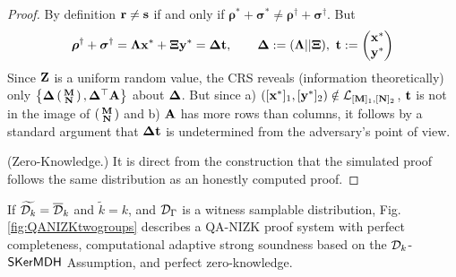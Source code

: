 \begin{proof}
By definition $\mathbf{r} \neq \mathbf{s}$  if and only if  $\boldsymbol \rho^{*}+\boldsymbol \sigma^{*} \neq 
\boldsymbol \rho^{\dagger}+ \boldsymbol \sigma^{\dagger}$.
But 
\begin{equation}
\boldsymbol \rho^{\dagger}+ \boldsymbol \sigma^{\dagger}=\mathbf{{\Lambda}}  \mathbf{x}^*+ \mathbf{{\Xi}} \mathbf{y}^*=
\mathbf{{\Delta}} \mathbf{t}, \qquad \mathbf{{\Delta}}:=(\mathbf{{\Lambda}}||\mathbf{{\Xi}}), \ \mathbf{t}:=\begin{pmatrix} \mathbf{x}^* \\ \mathbf{y}^* \end{pmatrix}
\end{equation}
Since $\mathbf{{Z}}$ is a uniform random value, the CRS reveals (information theoretically) only $\left\{\mathbf{{\Delta}}\left(\begin{smallmatrix}\mathbf{{M}}\\\mathbf{{N}}\end{smallmatrix}\right),  \mathbf{{\Delta}}^{\top}\mathbf{{A}} \right\}$ about $\mathbf{{\Delta}}$.
But since a) $([\mathbf{x}^*]_1,[\mathbf{y}^*]_2) \notin \mathcal{L}_{[\mathbf{{M}}]_1,[\mathbf{{N}}]_2}$, 
$\mathbf{t}$ is not in the image of $\left(\begin{smallmatrix}\mathbf{{M}}\\\mathbf{{N}}\end{smallmatrix}\right)$ and b) $\mathbf{{A}}$ has more rows than columns, it follows by a standard argument that $\mathbf{{\Delta}}\mathbf{t}$ is undetermined from the adversary's point of view.

(Zero-Knowledge.) It is direct from the construction that the simulated proof follows the same distribution as an honestly computed proof.
\end{proof}


\begin{theorem} If $\widetilde{\mathcal{D}_{k}}=\overline{\mathcal{D}}_k$ and $\tilde{k}=k$,  and $\mathcal{D}_{\Gamma}$ is a witness samplable distribution, Fig. \ref{fig:QANIZKtwogroups}
describes a QA-NIZK proof system with perfect completeness, computational adaptive strong soundness based on the  $\mathcal{D}_{k}$-$\mathsf{SKerMDH}$ Assumption, and perfect zero-knowledge. 
\label{theo:membtwogroups2}
\end{theorem}

